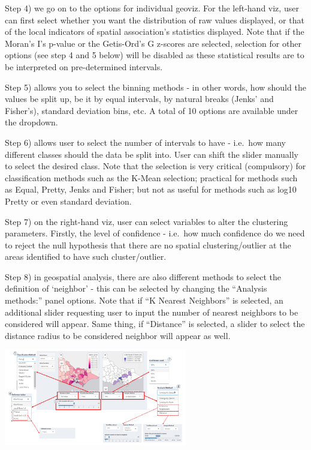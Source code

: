 \documentclass[
]{article}
\begin{document}
Step 4) we go on to the options for individual geoviz. For the left-hand
viz, user can first select whether you want the distribution of raw
values displayed, or that of the local indicators of spatial
association's statistics displayed. Note that if the Moran's I's p-value
or the Getis-Ord's G z-scores are selected, selection for other options
(see step 4 and 5 below) will be disabled as these statistical results
are to be interpreted on pre-determined intervals.

Step 5) allows you to select the binning methods - in other words, how
should the values be split up, be it by equal intervals, by natural
breaks (Jenks' and Fisher's), standard deviation bins, etc. A total of
10 options are available under the dropdown.

Step 6) allows user to select the number of intervals to have - i.e.~how
many different classes should the data be split into. User can shift the
slider manually to select the desired class. Note that the selection is
very critical (compulsory) for classification methods such as the K-Mean
selection; practical for methods such as Equal, Pretty, Jenks and
Fisher; but not as useful for methods such as log10 Pretty or even
standard deviation.

Step 7) on the right-hand viz, user can select variables to alter the
clustering parameters. Firstly, the level of confidence - i.e.~how much
confidence do we need to reject the null hypothesis that there are no
spatial clustering/outlier at the areas identified to have such
cluster/outlier.

Step 8) in geospatial analysis, there are also different methods to
select the definition of `neighbor' - this can be selected by changing
the ``Analysis methods:'' panel options. Note that if ``K Nearest
Neighbors'' is selected, an additional slider requesting user to input
the number of nearest neighbors to be considered will appear. Same
thing, if ``Distance'' is selected, a slider to select the distance
radius to be considered neighbor will appear as well.

\includegraphics[width=0.6\textwidth,height=\textheight]{images/geospatial2.png}
\end{document}
